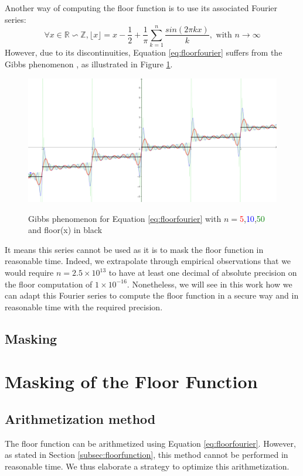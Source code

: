 \documentclass[runningheads]{llncs}
\begin{document}
\medskip

\noindent Another way of computing the floor function is to use its associated Fourier series:\begin{equation}\label{eq:floorfourier}
  \forall x \in \mathbb{R}\backsim \mathbb{Z}, \lfloor x\rfloor = x - \frac{1}{2} + \frac{1}{\pi}\sum_{k=1}^n \frac{sin(2\pi kx)}{k},\text{ with }n\rightarrow \infty
\end{equation}
However, due to its discontinuities, Equation \ref{eq:floorfourier} suffers from the Gibbs phenomenon \cite{8e44e918-40ae-3857-bb25-dc12ccf9e7c3}, as illustrated in Figure \ref{fig:gibbs}. 
\begin{figure}[!h]
  \includegraphics[width=\textwidth]{figure/gibbsphenomenon.png}
  \label{fig:gibbs}
  \caption{Gibbs phenomenon for Equation \ref{eq:floorfourier} with $n=$\textcolor{red}{5},\textcolor{blue}{10},\textcolor{green}{50} and floor(x) in black}
\end{figure}
It means this series cannot be used as it is to mask the floor function in reasonable time. Indeed, we extrapolate through empirical observations that we would require $n=2.5\times 10^{13}$ to have at least one decimal of absolute precision on the floor computation of $1\times 10^{-16}$. Nonetheless, we will see in this work how we can adapt this Fourier series to compute the floor function in a secure way and in reasonable time with the required precision.
\subsection{Masking}

\section{Masking of the Floor Function}\label{sec:maskfloor}
\subsection{Arithmetization method}
The floor function can be arithmetized using Equation \ref{eq:floorfourier}. However, as stated in Section \ref{subsec:floorfunction}, this method cannot be performed in reasonable time. We thus elaborate a strategy to optimize this arithmetization.
\end{document}
